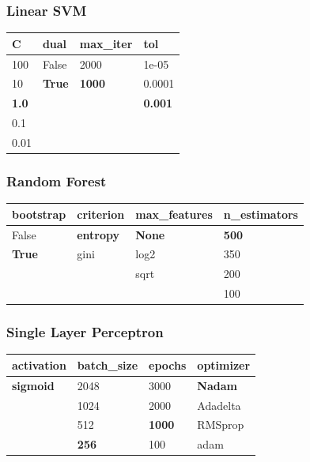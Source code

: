 \documentclass[epsfig,a4paper,11pt,titlepage,twoside,openany]{book}
\begin{document}
\subsubsection{Linear SVM}

\begin{table}[H]
\centering
\begin{tabular}{l|l|l|l}
C            & dual          & max\_iter     & tol            \\ \hline
100          & False         & 2000          & 1e-05          \\
10           & \textbf{True} & \textbf{1000} & 0.0001         \\
\textbf{1.0} &               &               & \textbf{0.001} \\
0.1          &               &               &                \\
0.01         &               &               & 
\end{tabular}
\end{table}


\subsubsection{Random Forest}

\begin{table}[H]
\centering
\begin{tabular}{l|l|l|l}
bootstrap     & criterion        & max\_features & n\_estimators \\ \hline
False         & \textbf{entropy} & \textbf{None} & \textbf{500}  \\
\textbf{True} & gini             & log2          & 350           \\
              &                  & sqrt          & 200           \\
              &                  &               & 100          
\end{tabular}
\end{table}


\subsubsection{Single Layer Perceptron}

\begin{table}[H]
\centering
\begin{tabular}{l|l|l|l}
activation       & batch\_size  & epochs        & optimizer      \\ \hline
\textbf{sigmoid} & 2048         & 3000          & \textbf{Nadam} \\
                 & 1024         & 2000          & Adadelta       \\
                 & 512          & \textbf{1000} & RMSprop        \\
                 & \textbf{256} & 100           & adam     
\end{tabular}
\end{table}
\end{document}
